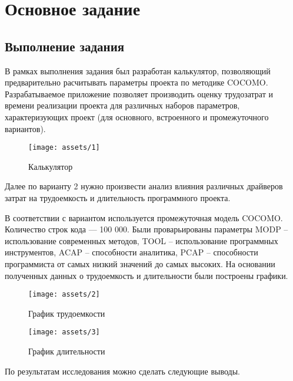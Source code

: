 \chapter{Основное задание}

\section{Выполнение задания}

В рамках выполнения задания был разработан калькулятор, позволяющий предварительно расчитывать параметры проекта по методике COCOMO. Разрабатываемое приложение позволяет производить оценку трудозатрат и времени реализации проекта для различных наборов параметров, характеризующих проект (для основного, встроенного и промежуточного вариантов).

\begin{figure}[H]
    \begin{center}
    \texttt{[image: assets/1]}
    \caption{Калькулятор}
    \label{fig:1}
    \end{center}
\end{figure}

Далее по варианту 2 нужно произвести анализ влияния различных драйверов затрат на трудоемкость и длительность программного проекта.

В соответствии с вариантом используется промежуточная модель COCOMO. Количество строк кода --- 100 000. Были проварьированы параметры MODP – использование современных методов, TOOL – использование программных инструментов, ACAP – способности аналитика, PCAP – способности программиста от самых низкий значений до самых высоких. На основании полученных данных о трудоемкость и длительности были построены графики.

\begin{figure}[H]
    \begin{center}
    \texttt{[image: assets/2]}
    \caption{График трудоемкости}
    \label{fig:2}
    \end{center}
\end{figure}

\begin{figure}[H]
    \begin{center}
    \texttt{[image: assets/3]}
    \caption{График длительности}
    \label{fig:3}
    \end{center}
\end{figure}

По результатам исследования можно сделать следующие выводы.

